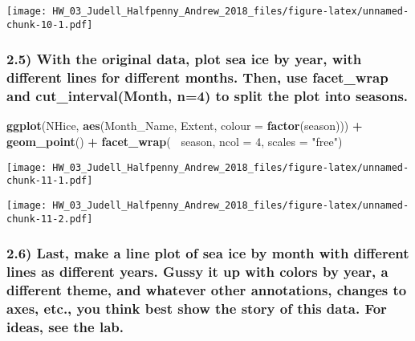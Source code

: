 \documentclass[]{article}
\newenvironment{Shaded}{\begin{snugshade}}{\end{snugshade}}
\newcommand{\KeywordTok}[1]{\textcolor[rgb]{0.13,0.29,0.53}{\textbf{#1}}}
\newcommand{\DataTypeTok}[1]{\textcolor[rgb]{0.13,0.29,0.53}{#1}}
\newcommand{\DecValTok}[1]{\textcolor[rgb]{0.00,0.00,0.81}{#1}}
\newcommand{\StringTok}[1]{\textcolor[rgb]{0.31,0.60,0.02}{#1}}
\newcommand{\OperatorTok}[1]{\textcolor[rgb]{0.81,0.36,0.00}{\textbf{#1}}}
\newcommand{\NormalTok}[1]{#1}
\begin{document}
\texttt{[image: HW\_03\_Judell\_Halfpenny\_Andrew\_2018\_files/figure-latex/unnamed-chunk-10-1.pdf]}

\subsubsection{2.5) With the original data, plot sea ice by year, with
different lines for different months. Then, use facet\_wrap and
cut\_interval(Month, n=4) to split the plot into
seasons.}\label{with-the-original-data-plot-sea-ice-by-year-with-different-lines-for-different-months.-then-use-facet_wrap-and-cut_intervalmonth-n4-to-split-the-plot-into-seasons.}

\begin{Shaded}
\begin{Highlighting}[]
\KeywordTok{ggplot}\NormalTok{(NHice, }\KeywordTok{aes}\NormalTok{(Month_Name, Extent, }\DataTypeTok{colour =} \KeywordTok{factor}\NormalTok{(season))) }\OperatorTok{+}
\StringTok{  }\KeywordTok{geom_point}\NormalTok{() }\OperatorTok{+}\StringTok{ }\KeywordTok{facet_wrap}\NormalTok{(}\OperatorTok{~}\StringTok{ }\NormalTok{season, }\DataTypeTok{ncol =} \DecValTok{4}\NormalTok{, }\DataTypeTok{scales =} \StringTok{"free"}\NormalTok{) }
\end{Highlighting}
\end{Shaded}

\texttt{[image: HW\_03\_Judell\_Halfpenny\_Andrew\_2018\_files/figure-latex/unnamed-chunk-11-1.pdf]}

\begin{Shaded}
\end{Shaded}

\texttt{[image: HW\_03\_Judell\_Halfpenny\_Andrew\_2018\_files/figure-latex/unnamed-chunk-11-2.pdf]}

\subsubsection{2.6) Last, make a line plot of sea ice by month with
different lines as different years. Gussy it up with colors by year, a
different theme, and whatever other annotations, changes to axes, etc.,
you think best show the story of this data. For ideas, see the
lab.}\label{last-make-a-line-plot-of-sea-ice-by-month-with-different-lines-as-different-years.-gussy-it-up-with-colors-by-year-a-different-theme-and-whatever-other-annotations-changes-to-axes-etc.-you-think-best-show-the-story-of-this-data.-for-ideas-see-the-lab.}
\end{document}
